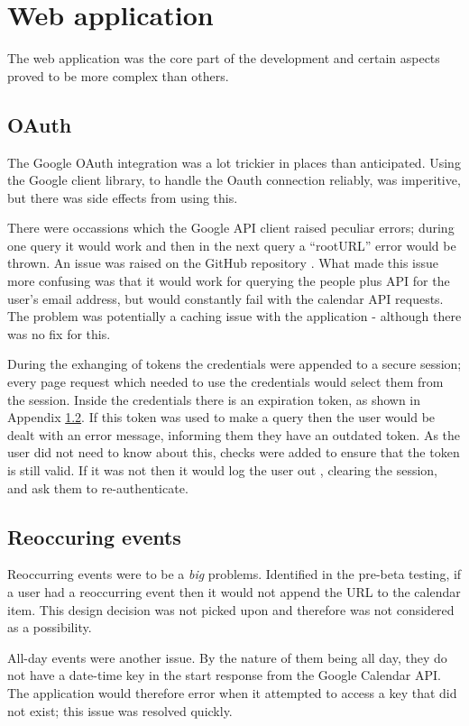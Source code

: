 {{{{{{\section{Web application}
The web application was the core part of the development and certain aspects proved to be more complex than others.
\subsection{OAuth}
The Google OAuth integration was a lot trickier in places than anticipated. Using the Google client library, to handle the Oauth connection reliably, was imperitive, but there was side effects from using this.

There were occassions which the Google API client raised peculiar errors; during one query it would work and then in the next query a ``rootURL'' error would be thrown. An issue was raised on the GitHub repository \cite{citeulike:14021433}. What made this issue more confusing was that it would work for querying the people plus API for the user's email address, but would constantly fail with the calendar API requests. The problem was potentially a caching issue with the application - although there was no fix for this.

During the exhanging of tokens the credentials were appended to a secure session; every page request which needed to use the credentials would select them from the session. Inside the credentials there is an expiration token, as shown in Appendix \ref{}. If this token was used to make a query then the user would be dealt with an error message, informing them they have an outdated token. As the user did not need to know about this, checks were added to ensure that the token is still valid. If it was not then it would log the user out , clearing the session, and ask them to re-authenticate.

\subsection{Reoccuring events}
Reoccurring events were to be a \textit{big} problems. Identified in the pre-beta testing, if a user had a reoccurring event then it would not append the URL to the calendar item. This design decision was not picked upon and therefore was not considered as a possibility.

All-day events were another issue. By the nature of them being all day, they do not have a date-time key in the start response from the Google Calendar API. The application would therefore error when it attempted to access a key that did not exist; this issue was resolved quickly.

}}}}}}
